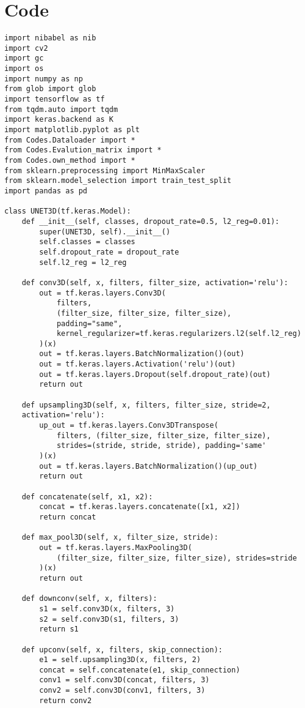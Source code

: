 \section*{Code}
\begin{verbatim}
import nibabel as nib
import cv2
import gc
import os
import numpy as np
from glob import glob
import tensorflow as tf
from tqdm.auto import tqdm
import keras.backend as K
import matplotlib.pyplot as plt
from Codes.Dataloader import *
from Codes.Evalution_matrix import *
from Codes.own_method import *
from sklearn.preprocessing import MinMaxScaler
from sklearn.model_selection import train_test_split
import pandas as pd

class UNET3D(tf.keras.Model):
    def __init__(self, classes, dropout_rate=0.5, l2_reg=0.01):
        super(UNET3D, self).__init__()
        self.classes = classes
        self.dropout_rate = dropout_rate
        self.l2_reg = l2_reg

    def conv3D(self, x, filters, filter_size, activation='relu'):
        out = tf.keras.layers.Conv3D(
            filters,
            (filter_size, filter_size, filter_size),
            padding="same",
            kernel_regularizer=tf.keras.regularizers.l2(self.l2_reg)
        )(x)
        out = tf.keras.layers.BatchNormalization()(out)
        out = tf.keras.layers.Activation('relu')(out)
        out = tf.keras.layers.Dropout(self.dropout_rate)(out)
        return out

    def upsampling3D(self, x, filters, filter_size, stride=2, 
    activation='relu'):
        up_out = tf.keras.layers.Conv3DTranspose(
            filters, (filter_size, filter_size, filter_size),
            strides=(stride, stride, stride), padding='same'
        )(x)
        out = tf.keras.layers.BatchNormalization()(up_out)
        return out

    def concatenate(self, x1, x2):
        concat = tf.keras.layers.concatenate([x1, x2])
        return concat

    def max_pool3D(self, x, filter_size, stride):
        out = tf.keras.layers.MaxPooling3D(
            (filter_size, filter_size, filter_size), strides=stride
        )(x)
        return out

    def downconv(self, x, filters):
        s1 = self.conv3D(x, filters, 3)
        s2 = self.conv3D(s1, filters, 3)
        return s1

    def upconv(self, x, filters, skip_connection):
        e1 = self.upsampling3D(x, filters, 2)
        concat = self.concatenate(e1, skip_connection)
        conv1 = self.conv3D(concat, filters, 3)
        conv2 = self.conv3D(conv1, filters, 3)
        return conv2


\end{verbatim}
